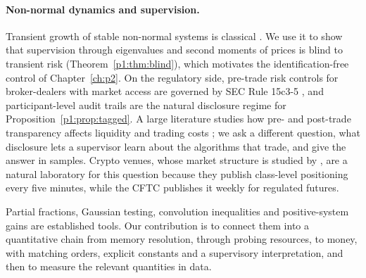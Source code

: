 \paragraph{Non-normal dynamics and supervision.} Transient growth of stable non-normal systems is classical \citep{p1:trefethen2005,p1:kreiss1962}. We use it to show that supervision through eigenvalues and second moments of prices is blind to transient risk (Theorem~\ref{p1:thm:blind}), which motivates the identification-free control of Chapter~\ref{ch:p2}. On the regulatory side, pre-trade risk controls for broker-dealers with market access are governed by SEC Rule 15c3-5 \citep{p1:sec2010}, and participant-level audit trails are the natural disclosure regime for Proposition~\ref{p1:prop:tagged}. A large literature studies how pre- and post-trade transparency affects liquidity and trading costs \citep{p1:pagano1996,p1:boehmer2005,p1:bessembinder2006}; we ask a different question, what disclosure lets a supervisor learn about the algorithms that trade, and give the answer in samples. Crypto venues, whose market structure is studied by \citet{p1:makarov2020}, are a natural laboratory for this question because they publish class-level positioning every five minutes, while the CFTC publishes it weekly for regulated futures.

Partial fractions, Gaussian testing, convolution inequalities and positive-system gains are established tools. Our contribution is to connect them into a quantitative chain from memory resolution, through probing resources, to money, with matching orders, explicit constants and a supervisory interpretation, and then to measure the relevant quantities in data.

